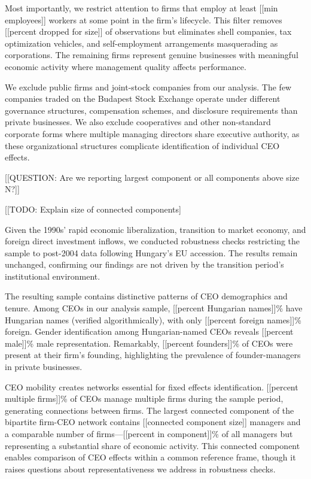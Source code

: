 \documentclass[11pt,a4paper]{article}
\begin{document}
Most importantly, we restrict attention to firms that employ at least [[min employees]] workers at some point in the firm's lifecycle. This filter removes [[percent dropped for size]] of observations but eliminates shell companies, tax optimization vehicles, and self-employment arrangements masquerading as corporations. The remaining firms represent genuine businesses with meaningful economic activity where management quality affects performance.

We exclude public firms and joint-stock companies from our analysis. The few companies traded on the Budapest Stock Exchange operate under different governance structures, compensation schemes, and disclosure requirements than private businesses. We also exclude cooperatives and other non-standard corporate forms where multiple managing directors share executive authority, as these organizational structures complicate identification of individual CEO effects.



[[QUESTION: Are we reporting largest component or all components above size N?]]

[[TODO: Explain size of connected components]

Given the 1990s' rapid economic liberalization, transition to market economy, and foreign direct investment inflows, we conducted robustness checks restricting the sample to post-2004 data following Hungary's EU accession. The results remain unchanged, confirming our findings are not driven by the transition period's institutional environment.

The resulting sample contains distinctive patterns of CEO demographics and tenure. Among CEOs in our analysis sample, [[percent Hungarian names]]\% have Hungarian names (verified algorithmically), with only [[percent foreign names]]\% foreign. Gender identification among Hungarian-named CEOs reveals [[percent male]]\% male representation. Remarkably, [[percent founders]]\% of CEOs were present at their firm's founding, highlighting the prevalence of founder-managers in private businesses.

CEO mobility creates networks essential for fixed effects identification. [[percent multiple firms]]\% of CEOs manage multiple firms during the sample period, generating connections between firms. The largest connected component of the bipartite firm-CEO network contains [[connected component size]] managers and a comparable number of firms—[[percent in component]]\% of all managers but representing a substantial share of economic activity. This connected component enables comparison of CEO effects within a common reference frame, though it raises questions about representativeness we address in robustness checks.
\end{document}
